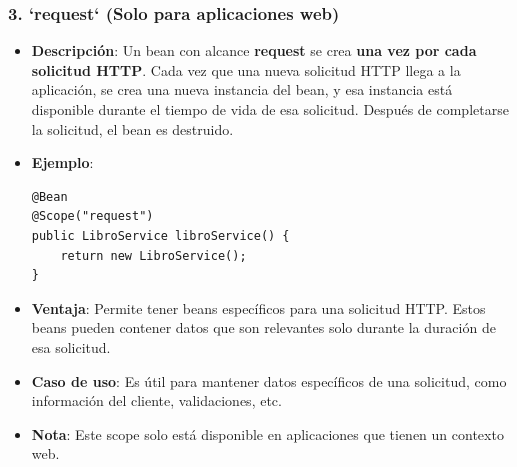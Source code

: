 \documentclass[11pt]{article}
\begin{document}
\subsubsection{3. \textbf{\textbf{`request`}} (Solo para aplicaciones web)}
\label{sec:orgd582e09}
\begin{itemize}
\item \textbf{\textbf{Descripción}}: Un bean con alcance \textbf{\textbf{request}} se crea \textbf{\textbf{una vez por cada solicitud HTTP}}. Cada vez que una nueva solicitud HTTP llega a la aplicación, se crea una nueva instancia del bean, y esa instancia está disponible durante el tiempo de vida de esa solicitud. Después de completarse la solicitud, el bean es destruido.

\item \textbf{\textbf{Ejemplo}}:
\begin{verbatim}
@Bean
@Scope("request")
public LibroService libroService() {
    return new LibroService();
}
\end{verbatim}

\item \textbf{\textbf{Ventaja}}: Permite tener beans específicos para una solicitud HTTP. Estos beans pueden contener datos que son relevantes solo durante la duración de esa solicitud.
\item \textbf{\textbf{Caso de uso}}: Es útil para mantener datos específicos de una solicitud, como información del cliente, validaciones, etc.
\item \textbf{\textbf{Nota}}: Este scope solo está disponible en aplicaciones que tienen un contexto web.
\end{itemize}
\end{document}
